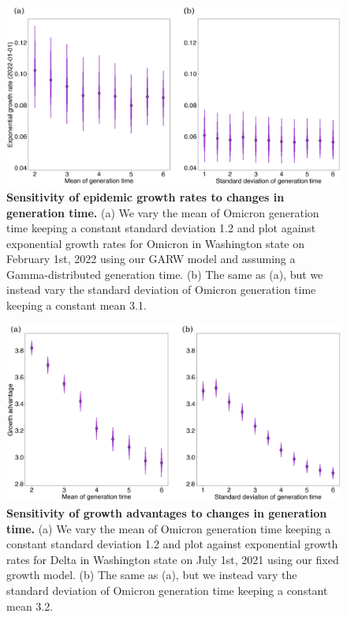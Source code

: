 \documentclass[11pt,oneside,letterpaper]{article}
\begin{document}
\begin{figure}
  \centering
  \includegraphics[width=\linewidth]{figs/little_r_sensitivity.png}
  \caption{\textbf{Sensitivity of epidemic growth rates to changes in generation time.} 
(a) We vary the mean of Omicron generation time keeping a constant standard deviation 1.2 and plot against exponential growth rates for Omicron in Washington state on February 1st, 2022 using our GARW model and assuming a Gamma-distributed generation time.
(b) The same as (a), but we instead vary the standard deviation of Omicron generation time keeping a constant mean 3.1. }%
  \label{fig:little_r_sensitivity}
\end{figure}

\begin{figure}
  \centering
  \includegraphics[width=\linewidth]{figs/growth_advantage_sensitivity.png}
  \caption{\textbf{Sensitivity of growth advantages to changes in generation time.} 
(a) We vary the mean of Omicron generation time keeping a constant standard deviation 1.2 and plot against exponential growth rates for Delta in Washington state on July 1st, 2021 using our fixed growth model.
(b) The same as (a), but we instead vary the standard deviation of Omicron generation time keeping a constant mean 3.2.}%
  \label{fig:growth_advantage_sensitivity}
\end{figure}
\end{document}
